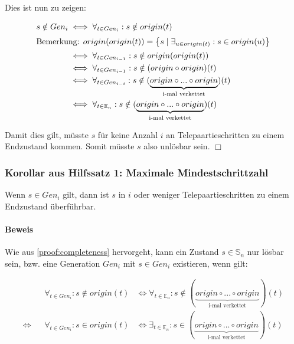 \documentclass[a4paper,10pt,ngerman]{scrartcl}
\begin{document}
Dies ist nun zu zeigen:

\begin{align*}
    s \notin Gen_{i}
    &\iff \forall_{t \in Gen_i} : s \notin origin(t) \\
    \intertext{Bemerkung: \(origin(origin(t)) = \left\{ s \mid \exists_{u \in origin(t)} : s \in origin(u) \right\}\)}
    &\iff \forall_{t \in Gen_{i-1}} : s \notin origin(origin(t)) \\
    &\iff \forall_{t \in Gen_{i-1}} : s \notin (origin \circ origin)(t) \\
    &\iff \forall_{t \in Gen_{i-i}} : s \notin (\underbrace{origin \circ ... \circ origin}_{\text{i-mal verkettet}})(t) \\
    &\iff \forall_{t \in \mathbb{E}_n} : s \notin (\underbrace{origin \circ ... \circ origin}_{\text{i-mal verkettet}})(t) \\
\end{align*}

Damit dies gilt, müsste \(s\) für keine Anzahl \(i\) an Telepaartieschritten zu einem Endzustand kommen. Somit müsste \(s\) also unlösbar sein. \(\Box\)

\subsubsection{Korollar aus Hilfssatz 1: Maximale Mindestschrittzahl} \label{proof:maxminsteps}

Wenn \(s \in Gen_i\) gilt, dann ist \(s\) in \(i\) oder weniger Telepaartieschritten zu einem Endzustand überführbar.

\paragraph{Beweis}

Wie aus \cref{proof:completeness} hervorgeht, kann ein Zustand \(s\in\mathbb{S}_n\) nur lösbar sein, bzw. eine Generation \(Gen_i\) mit \(s \in Gen_i\) existieren, wenn gilt:

\begin{align*}
    &&\forall_{t \in Gen_i} : s \notin origin(t) 
    &\iff \forall_{t \in \mathbb{E}_n} : s \notin (\underbrace{origin \circ ... \circ origin}_{\text{i-mal verkettet}})(t) \\ 
    \iff&& \forall_{t \in Gen_i} : s \in origin(t) 
    &\iff \exists_{t \in \mathbb{E}_n} : s \in (\underbrace{origin \circ ... \circ origin}_{\text{i-mal verkettet}})(t) \\ 
\end{align*}
\end{document}
